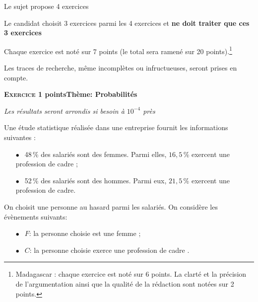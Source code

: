 \documentclass[10pt,a4paper]{article}
\begin{document}
\vspace{0,25cm}

Le sujet propose 4 exercices

Le candidat choisit 3 exercices parmi les 4 exercices et \textbf{ne doit traiter que ces 3 exercices}

Chaque exercice est noté sur 7 points (le total sera ramené sur 20 points).\footnote{Madagascar : chaque exercice est noté sur 6  points. La clarté et la précision de l'argumentation ainsi que la qualité de la rédaction sont notées sur 2 points.}

Les traces de recherche, même incomplètes ou infructueuses, seront prises en compte.

\bigskip

\textbf{\textsc{Exercice 1}  points\hfill Thème: Probabilités}

\medskip

\emph{Les résultats seront arrondis si besoin à $10^{- 4}$ près}

\medskip

Une étude statistique réalisée dans une entreprise fournit les informations suivantes :

\setlength\parindent{1cm}
\begin{itemize}
\item[$\bullet~~$] 48\,\% des salariés sont des femmes. Parmi elles, $16,5$\,\% exercent une
profession de cadre ;
\item[$\bullet~~$] 52\,\% des salariés sont des hommes. Parmi eux, $21,5$\,\% exercent une
profession de cadre.
\end{itemize}
\setlength\parindent{0cm}

\medskip

On choisit une personne au hasard parmi les salariés. On considère les évènements suivants:

\setlength\parindent{1cm}
\begin{itemize}
\item[$\bullet~~$] $F$: \og la personne choisie est une femme \fg{} ;
\item[$\bullet~~$] $C$: \og la personne choisie exerce une profession de cadre \fg.
\end{itemize}
\setlength\parindent{0cm}

\medskip
\end{document}
